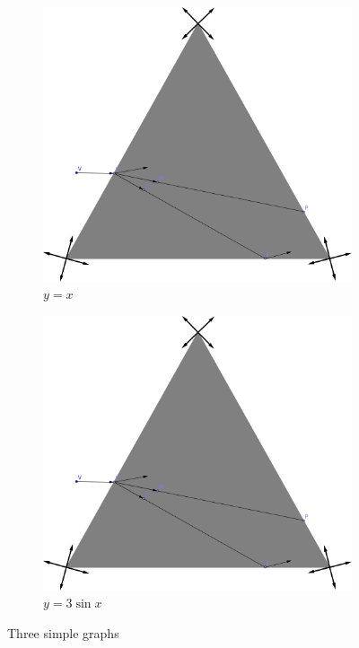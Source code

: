 \begin{figure}
     \centering
     \begin{subfigure}[b]{0.49\textwidth}
         \centering
         \includegraphics[width=\textwidth]{images/stream_1.png}
         \caption{$y=x$}
         \label{fig:y equals x}
     \end{subfigure}
     \hfill
     \begin{subfigure}[b]{0.49\textwidth}
         \centering
         \includegraphics[width=\textwidth]{images/stream_1.png}
         \caption{$y=3\sin x$}
         \label{fig:three sin x}
     \end{subfigure}
        \caption{Three simple graphs}
        \label{fig:draw_stream}
\end{figure}


